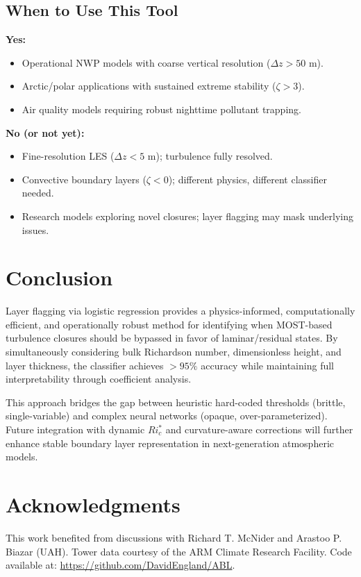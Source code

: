 \documentclass[11pt]{article}
\begin{document}
\subsection{When to Use This Tool}

\textbf{Yes:}
\begin{itemize}[leftmargin=*]
\item Operational NWP models with coarse vertical resolution ($\Delta z > 50$ m).
\item Arctic/polar applications with sustained extreme stability ($\zeta > 3$).
\item Air quality models requiring robust nighttime pollutant trapping.
\end{itemize}

\textbf{No (or not yet):}
\begin{itemize}[leftmargin=*]
\item Fine-resolution LES ($\Delta z < 5$ m); turbulence fully resolved.
\item Convective boundary layers ($\zeta < 0$); different physics, different classifier needed.
\item Research models exploring novel closures; layer flagging may mask underlying issues.
\end{itemize}

\section{Conclusion}

Layer flagging via logistic regression provides a physics-informed, computationally efficient, and operationally robust method for identifying when MOST-based turbulence closures should be bypassed in favor of laminar/residual states. By simultaneously considering bulk Richardson number, dimensionless height, and layer thickness, the classifier achieves $>95\%$ accuracy while maintaining full interpretability through coefficient analysis.

This approach bridges the gap between heuristic hard-coded thresholds (brittle, single-variable) and complex neural networks (opaque, over-parameterized). Future integration with dynamic $Ri_c^*$ and curvature-aware corrections will further enhance stable boundary layer representation in next-generation atmospheric models.

\section*{Acknowledgments}
This work benefited from discussions with Richard T. McNider and Arastoo P. Biazar (UAH). Tower data courtesy of the ARM Climate Research Facility. Code available at: \url{https://github.com/DavidEngland/ABL}.
\end{document}
